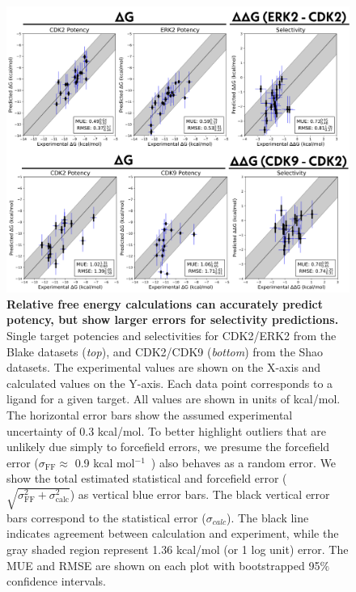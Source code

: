 \documentclass[9pt,lineno]{elife-modified} %
\begin{document}
\begin{figure}
\begin{fullwidth}
\begin{centering}
\includegraphics[width=1.0\linewidth]{figures/figure4.png}
\end{centering}
\caption{
\label{fig:figure-4}
{\bf Relative free energy calculations can accurately predict potency, but show larger errors for selectivity predictions.} \\
Single target potencies and selectivities for CDK2/ERK2 from the Blake datasets (\emph{top}), and CDK2/CDK9 (\emph{bottom}) from the Shao datasets. The experimental values are shown on the X-axis and calculated values on the Y-axis. Each data point corresponds to a ligand for a given target. All values are shown in units of kcal/mol. The horizontal error bars show the assumed experimental uncertainty of 0.3 kcal/mol\citep{BROWN2009420}. To better highlight outliers that are unlikely due simply to forcefield errors, we presume the forcefield error ($\sigma_\mathrm{FF} \approx$ 0.9 kcal mol$^{-1}$~\cite{Harder:J.Chem.TheoryComput.:2016}) also behaves as a random error. We show the total estimated statistical and forcefield error ($\sqrt{\sigma_\mathrm{FF}^2 + \sigma_\mathrm{calc}^2}$) as vertical blue error bars. The black vertical error bars correspond to the statistical error ($\sigma_{calc}$). The black line indicates agreement between calculation and experiment, while the gray shaded region represent 1.36 kcal/mol (or 1 log unit) error. The MUE and RMSE are shown on each plot with bootstrapped 95$\%$ confidence intervals.
}
\end{fullwidth}
\end{figure}
\end{document}
